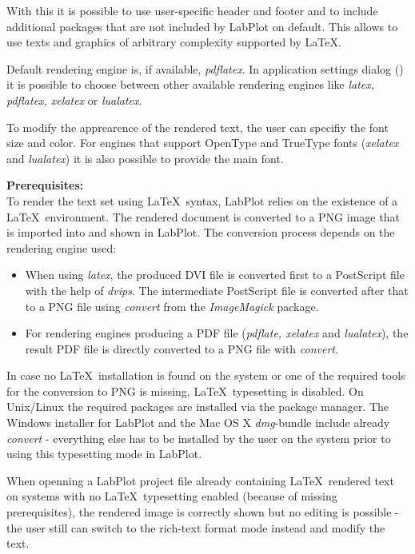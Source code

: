 With this it is possible to use user-specific header and footer and to include additional packages that are not included by LabPlot on default. This allows to use texts and graphics of arbitrary complexity supported by \LaTeX.

Default rendering engine is, if available, \textit{pdflatex}. In application settings dialog () it is possible to choose between other available rendering engines like \textit{latex, pdflatex, xelatex} or \textit{lualatex}.

To modify the apprearence of the rendered text, the user can specifiy the font size and color. For engines that support OpenType and TrueType fonts (\textit{xelatex} and \textit{lualatex}) it is also possible to provide the main font.


\textbf{Prerequisites:}\\
To render the text set using \LaTeX\, syntax, LabPlot relies on the existence of a \LaTeX\, environment. The rendered document is converted to a PNG image that is imported into and shown in LabPlot. The conversion process depends on the rendering engine used:
\begin{itemize}
\item When using \textit{latex}, the produced DVI file is converted first to a PostScript file with the help of \textit{dvips}. The intermediate PostScript file is converted after that to a PNG file using \textit{convert} from the \textit{ImageMagick} package.
\item For rendering engines producing a PDF file (\textit{pdflate, xelatex} and \textit{lualatex}), the result PDF file is directly converted to a PNG file with \textit{convert}.
\end{itemize}

In case no \LaTeX\, installation is found on the system or one of the required tools for the conversion to PNG is missing, \LaTeX\, typesetting is disabled. On Unix/Linux the required packages are installed via the package manager. The Windows installer for LabPlot and the Mac OS X \textit{dmg}-bundle include already \textit{convert} - everything else has to be installed by the user on the system prior to using this typesetting mode in LabPlot.

When openning a LabPlot project file already containing \LaTeX\, rendered text on systems with no \LaTeX\, typesetting enabled (because of missing prerequisites), the rendered image is  correctly shown but no editing is possible - the user still can switch to the rich-text format mode instead and modify the text.


